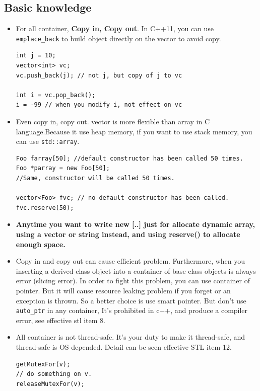 \documentclass[a4paper,11pt,twoside]{book}
\begin{document}
\subsection{Basic knowledge}
\begin{itemize}

\item For all container, \textbf{Copy in, Copy out}. In C++11, you can use \texttt{emplace\_back} to build object directly on the vector to avoid copy.
\begin{lstlisting}[numbers=none]
int j = 10;
vector<int> vc;
vc.push_back(j); // not j, but copy of j to vc

int i = vc.pop_back(); 
i = -99 // when you modify i, not effect on vc
\end{lstlisting}

\item Even copy in, copy out. vector is more flexible than array in C language.Because it use heap memory, if you want to use stack memory, you can use \texttt{std::array}.
\begin{lstlisting}[numbers=none]
Foo farray[50]; //default constructor has been called 50 times.
Foo *parray = new Foo[50]; 
//Same, constructor will be called 50 times.

vector<Foo> fvc; // no default constructor has been called.
fvc.reserve(50);
\end{lstlisting}

\item \textbf{Anytime you want to write new [..] just for allocate dynamic array, using a vector or string instead, and using reserve() to allocate enough space.}


\item Copy in and copy out can cause efficient problem. Furthermore, when you inserting a derived class object into a container of base class objects is always error (slicing error). In order to fight this problem, you can use container of pointer. But it will cause resource leaking problem if you forget or an exception is thrown. So a better choice is use smart pointer. But don't use \texttt{auto\_ptr} in any container, It's prohibited in c++, and produce a compiler error, see effective stl item 8.

\item All container is not thread-safe. It's your duty to make it thread-safe, and thread-safe is OS depended. Detail can be seen effective STL item 12.
\begin{lstlisting}[numbers=none]
getMutexFor(v);
// do something on v.
releaseMutexFor(v);
\end{lstlisting}


\end{itemize}
\end{document}
